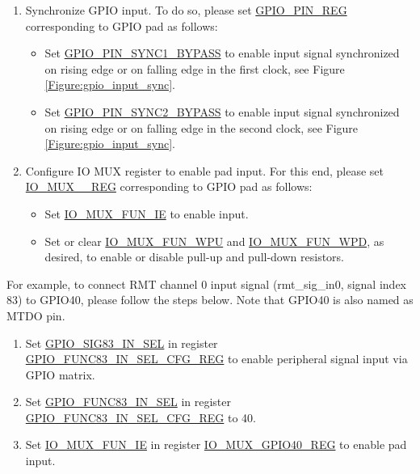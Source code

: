\documentclass[main\_\_EN.tex]{subfiles}
\begin{document}
\begin{enumerate}
    \item Synchronize GPIO input. To do so, please set \hyperref[regdesc:GPIOPINNREG]{GPIO\_PIN\_REG} corresponding to GPIO pad  as follows:
    \begin{itemize}
        \item Set \hyperref[fielddesc:GPIOPINNSYNC1BYPASS]{GPIO\_PIN\_SYNC1\_BYPASS} to enable input signal synchronized on rising edge or on falling edge in the first clock, see Figure \ref{Figure:gpio_input_sync}.
    \end{itemize}
    \begin{itemize}
        \item Set \hyperref[fielddesc:GPIOPINNSYNC2BYPASS]{GPIO\_PIN\_SYNC2\_BYPASS} to enable input signal synchronized on rising edge or on falling edge in the second clock, see Figure \ref{Figure:gpio_input_sync}.
    \end{itemize}
    \item Configure IO MUX register to enable pad input. For this end, please set \hyperref[regdesc:IOMUXnREG]{IO\_MUX\_\_REG} corresponding to GPIO pad  as follows:
    \begin{itemize}
        \item Set \hyperref[fielddesc:IOMUXFUNIE]{IO\_MUX\_FUN\_IE} to enable input.
        \item Set or clear \hyperref[fielddesc:IOMUXFUNWPU]{IO\_MUX\_FUN\_WPU} and \hyperref[fielddesc:IOMUXFUNWPD]{IO\_MUX\_FUN\_WPD}, as desired, to enable or disable pull-up and pull-down resistors.
    \end{itemize}
\end{enumerate}

For example, to connect RMT channel 0 input signal (rmt\_sig\_in0, signal index 83) to GPIO40, please follow the steps below. Note that GPIO40 is also named as MTDO pin.

\begin{enumerate}
\item Set \hyperref[fielddesc:GPIOSIGNINSEL]{GPIO\_SIG83\_IN\_SEL} in register \hyperref[regdesc:GPIOFUNCNINSELCFGREG]{GPIO\_FUNC83\_IN\_SEL\_CFG\_REG} to enable peripheral signal input via GPIO matrix.
\item Set \hyperref[fielddesc:GPIOFUNCNINSEL]{GPIO\_FUNC83\_IN\_SEL} in register \hyperref[regdesc:GPIOFUNCNINSELCFGREG]{GPIO\_FUNC83\_IN\_SEL\_CFG\_REG} to 40.
\item Set \hyperref[fielddesc:IOMUXFUNIE]{IO\_MUX\_FUN\_IE} in register \hyperref[regdesc:IOMUXnREG]{IO\_MUX\_GPIO40\_REG} to enable pad input.
\end{enumerate}
\end{document}
